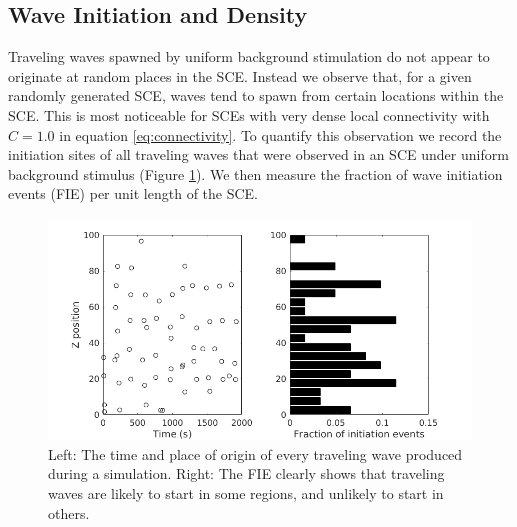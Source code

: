 \documentclass[12pt]{article}
\begin{document}
\FloatBarrier


\subsection{Wave Initiation and Density} \label{sub:wave_initiation}
Traveling waves spawned by uniform background stimulation do not appear to originate at random places in the SCE.
Instead we observe that, for a given randomly generated SCE, waves tend to spawn from certain locations within the SCE.
This is most noticeable for SCEs with very dense local connectivity with $C=1.0$ in equation \ref{eq:connectivity}.
To quantify this observation we record the initiation sites of all traveling waves that were observed in an SCE under uniform background stimulus (Figure \ref{fig:wave_initiation_sites}).
We then measure the fraction of wave initiation events (FIE) per unit length of the SCE.

\begin{figure}[!htb]
 \caption{Left: The time and place of origin of every traveling wave produced during a simulation. Right: The FIE clearly shows that traveling waves are likely to start in some regions, and unlikely to start in others.}
 \label{fig:wave_initiation_sites}
 \centering
   \includegraphics[width=\textwidth]{fig/InitiationSites_100sims}
\end{figure}
\end{document}
